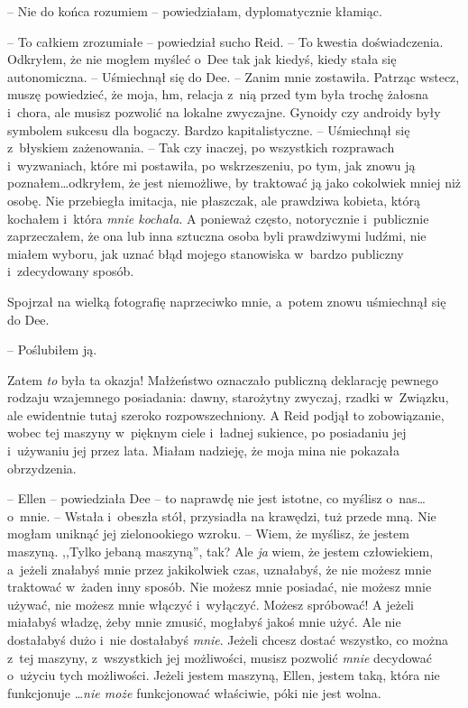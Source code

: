 \documentclass[oneside,polish,11pt,sfheadings]{mwbk}
\begin{document}
-- Nie do końca rozumiem -- powiedziałam, dyplomatycznie kłamiąc.

-- To całkiem zrozumiałe -- powiedział sucho Reid. -- To kwestia
doświadczenia. Odkryłem, że nie mogłem myśleć o~Dee tak jak kiedyś,
kiedy stała się autonomiczna. -- Uśmiechnął się do Dee. -- Zanim mnie
zostawiła. Patrząc wstecz, muszę powiedzieć, że moja, hm, relacja z~nią
przed tym była trochę żałosna i~chora, ale musisz pozwolić na lokalne
zwyczajne. Gynoidy czy androidy były symbolem sukcesu dla bogaczy.
Bardzo kapitalistyczne. -- Uśmiechnął się z~błyskiem zażenowania. -- Tak
czy inaczej, po wszystkich rozprawach i~wyzwaniach, które mi postawiła,
po wskrzeszeniu, po tym, jak znowu ją poznałem\ldots  odkryłem, że jest
niemożliwe, by traktować ją jako cokolwiek mniej niż osobę. Nie
przebiegła imitacja, nie płaszczak, ale prawdziwa kobieta, którą
kochałem i~która \textit{mnie kochała}. A ponieważ często, notorycznie i~publicznie zaprzeczałem, że ona lub inna sztuczna osoba byli prawdziwymi
ludźmi, nie miałem wyboru, jak uznać błąd mojego stanowiska w~bardzo
publiczny i~zdecydowany sposób.

Spojrzał na wielką fotografię naprzeciwko mnie, a~potem znowu uśmiechnął
się do Dee. 

-- Poślubiłem ją.

Zatem \textit{to} była ta okazja! Małżeństwo oznaczało publiczną
deklarację pewnego rodzaju wzajemnego posiadania: dawny, starożytny
zwyczaj, rzadki w~Związku, ale ewidentnie tutaj szeroko
rozpowszechniony. A Reid podjął to zobowiązanie, wobec tej maszyny w~pięknym ciele i~ładnej sukience, po posiadaniu jej i~używaniu jej przez
lata. Miałam nadzieję, że moja mina nie pokazała obrzydzenia.

-- Ellen -- powiedziała Dee -- to naprawdę nie jest istotne, co myślisz o~nas\ldots  o~mnie. -- Wstała i~obeszła stół, przysiadła na krawędzi, tuż
przede mną. Nie mogłam uniknąć jej zielonookiego wzroku. -- Wiem, że
myślisz, że jestem maszyną. ,,Tylko jebaną maszyną'', tak? Ale \textit{ja}
wiem, że jestem człowiekiem, a~jeżeli znałabyś mnie przez jakikolwiek
czas, uznałabyś, że nie możesz mnie traktować w~żaden inny sposób. Nie
możesz mnie posiadać, nie możesz mnie używać, nie możesz mnie włączyć i~wyłączyć. Możesz spróbować! A jeżeli miałabyś władzę, żeby mnie zmusić,
mogłabyś jakoś mnie użyć. Ale nie dostałabyś dużo i~nie dostałabyś
\textit{mnie}. Jeżeli chcesz dostać wszystko, co można z~tej maszyny, z~wszystkich jej możliwości, musisz pozwolić \textit{mnie} decydować o~użyciu tych możliwości. Jeżeli jestem maszyną, Ellen, jestem taką, która
nie funkcjonuje \ldots  \textit{nie może} funkcjonować właściwie, póki nie
jest wolna.
\end{document}
